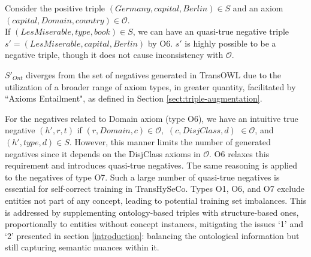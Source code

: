 \documentclass[sigconf]{acmart}
\newcommand{\TransHI}{TransHySeCo\xspace}
\begin{document}
\begin{small}
\begin{example}
    Consider the positive triple $(Germany, capital, Berlin)\in S$ and an axiom $(capital, Domain, country)\in\mathcal{O}$. \\ If $(LesMiserable, type, book)\in S$, we can have an quasi-true negative triple $s'=(LesMiserable, capital, Berlin)$ by O6. $s'$ is highly possible to be a negative triple, though it does not cause inconsistency with $\mathcal{O}$.
\end{example}
\end{small}
$S'_{Ont}$ diverges from the set of negatives generated in TransOWL \cite{transrowl} due to the utilization of a broader range of axiom types, in greater quantity, facilitated by  ``Axioms Entailment", as defined in Section \ref{sect:triple-augmentation}. 

For the negatives related to Domain axiom (type O6), we have an intuitive true negative $(h',r,t)$  if $(r,Domain,c)\in\mathcal{O},$ $ (c,DisjClass,d)$ $\in \mathcal{O}$, and $(h',type,d)\in S$. However, this manner limits the number of generated negatives since it depends on the DisjClass axioms in $\mathcal{O}$.  O6 relaxes this requirement and introduces quasi-true negatives. The same reasoning is applied to the negatives of type O7. Such a large number of quasi-true negatives is essential for self-correct training in \TransHI. Types O1, O6, and O7 exclude entities not part of any concept, leading to potential training set imbalances. This is addressed by supplementing ontology-based triples with structure-based ones, proportionally to entities without concept instances, mitigating the issues `1' and `2' presented in section \ref{introduction}: balancing the ontological information but still capturing semantic nuances within it.
\end{document}
